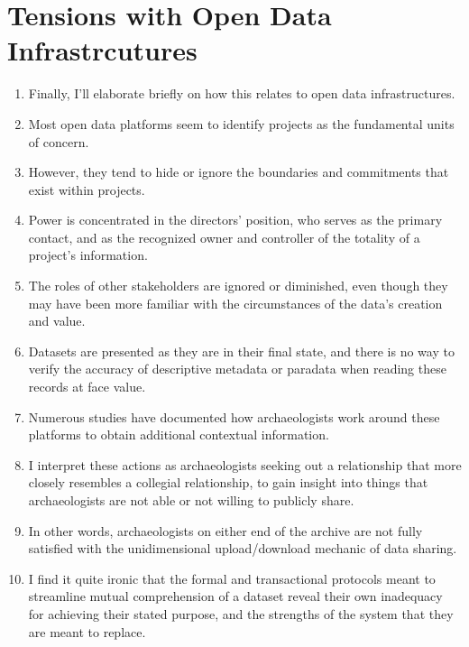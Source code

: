 \documentclass{article}
\begin{document}
\section{Tensions with Open Data Infrastrcutures}
\begin{enumerate}
  \item Finally, I'll elaborate briefly on how this relates to open data infrastructures.
  \item Most open data platforms seem to identify projects as the fundamental units of concern.
  \item However, they tend to hide or ignore the boundaries and commitments that exist within projects.
  \item Power is concentrated in the directors' position, who serves as the primary contact, and as the recognized owner and controller of the totality of a project's information.
  \item The roles of other stakeholders are ignored or diminished, even though they may have been more familiar with the circumstances of the data's creation and value.
  \item Datasets are presented as they are in their final state, and there is no way to verify the accuracy of descriptive metadata or paradata when reading these records at face value.
  \item Numerous studies have documented how archaeologists work around these platforms to obtain additional contextual information.
  \item I interpret these actions as archaeologists seeking out a relationship that more closely resembles a collegial relationship, to gain insight into things that archaeologists are not able or not willing to publicly share.
  \item In other words, archaeologists on either end of the archive are not fully satisfied with the unidimensional upload/download mechanic of data sharing.
  \item I find it quite ironic that the formal and transactional protocols meant to streamline mutual comprehension of a dataset reveal their own inadequacy for achieving their stated purpose, and the strengths of the system that they are meant to replace.
\end{enumerate}
\end{document}
